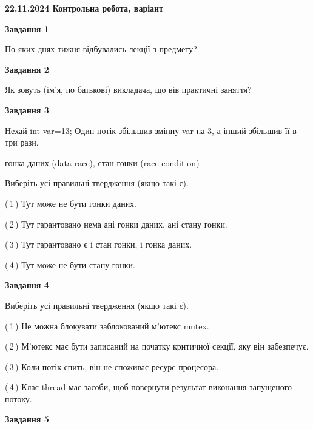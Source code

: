 \documentclass[12pt, ukrainian]{article}
\begin{document}
\begin {large}

\textbf{22.11.2024 Контрольна робота, варіант  }\par


{

\begin{center}
\textbf{Завдання 1}
\end{center}

По яких днях тижня відбувались лекції з предмету?


\begin{center}
\textbf{Завдання 2}
\end{center}

Як зовуть (ім'я, по батькові) викладача, що вів практичні заняття?


\begin{center}
\textbf{Завдання 3}
\end{center}

Нехай int var=13; Один потік збільшив змінну var на 3, а інший збільшив її в три рази.

гонка даних (data race), стан гонки (race condition)

Виберіть усі правильні твердження (якщо такі є).\par
\vspace{2mm}
(\,1\,) Тут може не бути гонки даних.%

(\,2\,) Тут гарантовано нема ані гонки даних, ані стану гонки.%

(\,3\,) Тут гарантовано є і стан гонки, і гонка даних.%

(\,4\,) Тут може не бути стану гонки.%


\begin{center}
\textbf{Завдання 4}
\end{center}

Виберіть усі правильні твердження (якщо такі є).\par
\vspace{2mm}

(\,1\,) Не можна блокувати заблокований м’ютекс mutex.%

(\,2\,) М’ютекс має бути записаний на початку критичної секції, яку він забезпечує.%

(\,3\,) Коли потік спить, він не споживає ресурс процесора.%

(\,4\,) Клас thread має засоби, щоб повернути результат виконання запущеного потоку.%


\begin{center}
\textbf{Завдання 5}
\end{center}

}
\end{large}
\end{document}
